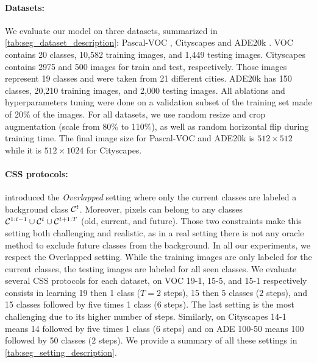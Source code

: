 \paragraph{Datasets:} We evaluate our model on three datasets, summarized in
\autoref{tab:seg_dataset_description}: Pascal-VOC \citep{everingham2015pascalvoc},
Cityscapes \citep{cordts2016cityscapes} and ADE20k \citep{zhou2017adedataset}. VOC contains 20
classes, 10,582 training images, and 1,449 testing images. Cityscapes contains 2975 and 500 images
for train and test, respectively. Those images represent 19 classes and were taken from 21 different
cities. ADE20k has 150 classes, 20,210 training images, and 2,000 testing images. All ablations and
hyperparameters tuning were done on a validation subset of the training set made of 20\% of the
images. For all datasets, we use random resize and crop augmentation (scale from 80\% to 110\%), as
well as random horizontal flip during training time. The final image size for Pascal-VOC and ADE20k
is $512 \times 512$ while it is $512 \times 1024$ for Cityscapes.

\paragraph{CSS protocols:} \cite{cermelli2020modelingthebackground} introduced the
\textit{Overlapped} setting where only the current classes are labeled \vs a background class
$\mathcal{C}^t$. Moreover, pixels can belong to any classes $\mathcal{C}^{1:t-1} \cup \mathcal{C}^{t} \cup \mathcal{C}^{t+1:T}$
(old, current, and future). Those two constraints make this setting both challenging and realistic,
as in a real setting there is not any oracle method to exclude future classes from the background. In
all our experiments, we respect the Overlapped setting. While the training images are only labeled
for the current classes, the testing images are labeled for all seen classes. We evaluate several
\ac{CSS} protocols for each dataset, \eg on VOC 19-1, 15-5, and 15-1 respectively consists in learning
19 then 1 class ($T=2$ steps), 15 then 5 classes ($2$ steps), and 15 classes followed by five times
1 class ($6$ steps). The last setting is the most challenging due to its higher number of steps.
Similarly, on Cityscapes 14-1 means 14 followed by five times 1 class ($6$ steps) and on ADE 100-50
means 100 followed by 50 classes ($2$ steps). We provide a summary of all these settings in
\autoref{tab:seg_setting_description}.

